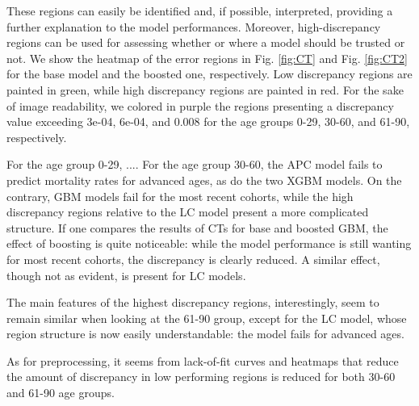 \documentclass[fleqn,10pt]{wlscirep}
\begin{document}
These regions can easily be identified and, if possible, interpreted, providing a further explanation to the model performances. Moreover, high-discrepancy regions can be used for assessing whether or where a model should be trusted or not. \color{blue}We show the heatmap of the error regions in Fig. \ref{fig:CT} and Fig. \ref{fig:CT2} for the base model and the boosted one, respectively. \color{black} Low discrepancy regions are painted in green, while high discrepancy regions are painted in red. 
For the sake of image readability, we colored in purple the regions presenting a discrepancy value exceeding 3e-04, 6e-04, and 0.008 for the age groups 0-29, 30-60, and 61-90, respectively.

\color{red}For the age group 0-29, .... \color{black} 
For the age group 30-60, the APC model fails to predict mortality rates for advanced ages, as do the two XGBM models. On the contrary, GBM models fail for the most recent cohorts, while the high discrepancy regions relative to the LC model present a more complicated structure. 
If one compares the results of CTs for base and boosted GBM, the effect of boosting is quite noticeable: while the model performance is still wanting for most recent cohorts, the discrepancy is clearly reduced. A similar effect, though not as evident, is present for LC models.

The main features of the highest discrepancy regions, interestingly, seem to remain similar when looking at the 61-90 group, except for the LC model, whose region structure is now easily understandable: the model fails for advanced ages.

As for preprocessing, it seems from lack-of-fit curves and heatmaps that reduce the amount of discrepancy in low performing regions is reduced for both 30-60 and 61-90 age groups.
\end{document}
